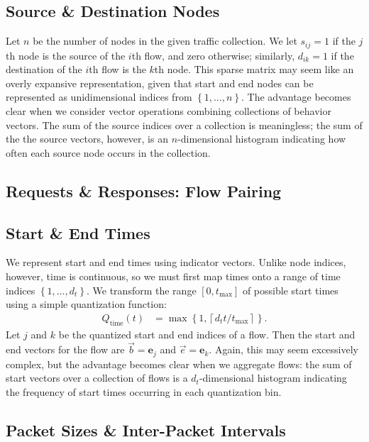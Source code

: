 \documentclass[conference]{IEEEtran}
\newcommand{\Qt}{Q_{\text{time}}}
\newcommand{\set}[1]{\left\{#1\right\}}
\newcommand{\ceil}[1]{\left\lceil#1\right\rceil}
\newcommand{\fracx}[2]{#1/#2}
\begin{document}
\subsection{Source \& Destination Nodes}

Let $n$ be the number of nodes in the given traffic collection. We let $s_{ij}=1$ if the $j$th node is the source of the $i$th flow, and zero otherwise; similarly, $d_{ik}=1$ if the destination of the $i$th flow is the $k$th node. This sparse matrix may seem like an overly expansive representation, given that start and end nodes can be represented as unidimensional indices from $\set{1,\dots,n}$. The advantage becomes clear when we consider vector operations combining collections of behavior vectors. The sum of the source indices over a collection is meaningless; the sum of the the source vectors, however, is an $n$-dimensional histogram indicating how often each source node occurs in the collection.

\subsection{Requests \& Responses: Flow Pairing}



\subsection{Start \& End Times}

We represent start and end times using indicator vectors. Unlike node indices, however, time is continuous, so we must first map times onto a range of time indices $\set{1,\dots,d_t}$. We transform the range $[0,t_{\max}]$ of possible start times using a simple quantization function:
\begin{align}
\Qt(t) &= \max\set{1,\ceil{\fracx{d_t t}{t_{\max}}}}.
\end{align}
Let $j$ and $k$ be the quantized start and end indices of a flow. Then the start and end vectors for the flow are $\vec{b}=\mathbf{e}_j$ and $\vec{e}=\mathbf{e}_k$. Again, this may seem excessively complex, but the advantage becomes clear when we aggregate flows: the sum of start vectors over a collection of flows is a $d_t$-dimensional histogram indicating the frequency of start times occurring in each quantization bin.

\subsection{Packet Sizes \& Inter-Packet Intervals}
\end{document}
